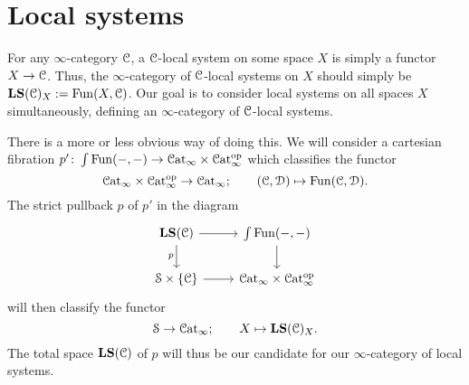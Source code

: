 \documentclass[main.tex]{subfiles}
\begin{document}
\section{Local systems}
\label{sec:local_systems}

For any $\infty$-category $\mathcal{C}$, a $\mathcal{C}$-local system on some space $X$ is simply a functor $X \to \mathcal{C}$. Thus, the $\infty$-category of $\mathcal{C}$-local systems on $X$ should simply be $\mathbf{LS}(\mathcal{C})_{X}:=\mathrm{Fun}(X, \mathcal{C})$. Our goal is to consider local systems on all spaces $X$ simultaneously, defining an $\infty$-category of $\mathcal{C}$-local systems.

There is a more or less obvious way of doing this. We will consider a cartesian fibration $p'\colon\int\mathrm{Fun}(-, -) \to \mathcal{C}\mathrm{at}_{\infty} \times \mathcal{C}\mathrm{at}_{\infty}^{\mathrm{op}}$ which classifies the functor
\begin{equation*}
  \mathcal{C}\mathrm{at}_{\infty} \times \mathcal{C}\mathrm{at}_{\infty}^{\mathrm{op}} \to \mathcal{C}\mathrm{at}_{\infty};\qquad (\mathcal{C}, \mathcal{D}) \mapsto \mathrm{Fun}(\mathcal{C}, \mathcal{D}).
\end{equation*}
The strict pullback $p$ of $p'$ in the diagram
\begin{equation*}
  \begin{tikzcd}
    \LS(\category{C})
    \arrow[r]
    \arrow[d, swap, "p"]
    & \int\Fun(-, -)
    \arrow[d]
    \\
    \S \times \{\category{C}\}
    \arrow[r]
    & \ICat \times \ICat\op
  \end{tikzcd}
\end{equation*}
will then classify the functor
\begin{equation*}
  \mathcal{S} \to \mathcal{C}\mathrm{at}_{\infty};\qquad X \mapsto \mathbf{LS}(\mathcal{C})_{X}.
\end{equation*}
The total space $\mathbf{LS}(\mathcal{C})$ of $p$ will thus be our candidate for our $\infty$-category of local systems.
\end{document}
